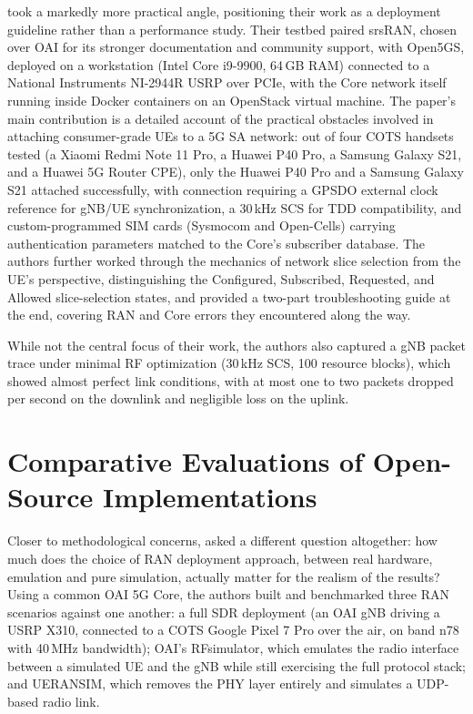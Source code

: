 \textcite{mamushiane2023deploying} took a markedly more practical angle, positioning their work as a deployment guideline rather than a performance study. Their testbed paired srsRAN, chosen over \gls{OAI} for its stronger documentation and community support, with Open5GS, deployed on a workstation (Intel Core i9-9900, 64\,GB RAM) connected to a National Instruments NI-2944R USRP over PCIe, with the Core network itself running inside Docker containers on an OpenStack virtual machine. The paper's main contribution is a detailed account of the practical obstacles involved in attaching consumer-grade \glspl{UE} to a 5G \gls{SA} network: out of four \gls{COTS} handsets tested (a Xiaomi Redmi Note 11 Pro, a Huawei P40 Pro, a Samsung Galaxy S21, and a Huawei 5G Router CPE), only the Huawei P40 Pro and a Samsung Galaxy S21 attached successfully, with connection requiring a \gls{GPSDO} external clock reference for \gls{gNB}/\gls{UE} synchronization, a 30\,kHz \gls{SCS} for \gls{TDD} compatibility, and custom-programmed SIM cards (Sysmocom and Open-Cells) carrying authentication parameters matched to the Core's subscriber database. The authors further worked through the mechanics of network slice selection from the \gls{UE}'s perspective, distinguishing the Configured, Subscribed, Requested, and Allowed slice-selection states, and provided a two-part troubleshooting guide at the end, covering \gls{RAN} and Core errors they encountered along the way.

While not the central focus of their work, the authors also captured a \gls{gNB} packet trace under minimal \gls{RF} optimization (30\,kHz \gls{SCS}, 100 resource blocks), which showed almost perfect link conditions, with at most one to two packets dropped per second on the downlink and negligible loss on the uplink.

\section{Comparative Evaluations of Open-Source Implementations}
\label{sec:related_comparative}

Closer to methodological concerns, \textcite{rouili2024evaluating} asked a different question altogether: how much does the choice of \gls{RAN} deployment approach, between real hardware, emulation and pure simulation, actually matter for the realism of the results? Using a common \gls{OAI} 5G Core, the authors built and benchmarked three \gls{RAN} scenarios against one another: a full \gls{SDR} deployment (an \gls{OAI} \gls{gNB} driving a USRP X310, connected to a \gls{COTS} Google Pixel 7 Pro over the air, on band n78 with 40\,MHz bandwidth); \gls{OAI}'s RFsimulator, which emulates the radio interface between a simulated \gls{UE} and the \gls{gNB} while still exercising the full protocol stack; and UERANSIM, which removes the \gls{PHY} layer entirely and simulates a UDP-based radio link.

